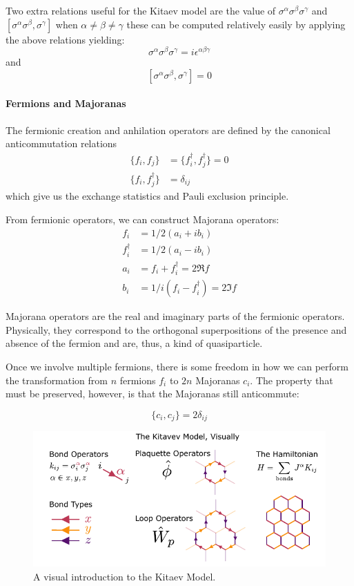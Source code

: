 Two extra relations useful for the Kitaev model are the value of \(\sigma^\alpha \sigma^\beta \sigma^\gamma\) and \([\sigma^\alpha \sigma^\beta, \sigma^\gamma]\) when \(\alpha \neq \beta \neq \gamma\) these can be computed relatively easily by applying the above relations yielding: \[\sigma^\alpha \sigma^\beta \sigma^\gamma = i \epsilon^{\alpha\beta\gamma}\] and \[[\sigma^\alpha \sigma^\beta, \sigma^\gamma] = 0\]

\hypertarget{fermions-and-majoranas}{%
\paragraph{Fermions and Majoranas}\label{fermions-and-majoranas}}

The fermionic creation and anhilation operators are defined by the canonical anticommutation relations \[\begin{aligned}
\{f_i, f_j\} &= \{f^\dagger_i, f^\dagger_j\} = 0\\
\{f_i, f^\dagger_j\} &= \delta_{ij}
\end{aligned}\] which give us the exchange statistics and Pauli exclusion principle.

From fermionic operators, we can construct Majorana operators: \[\begin{aligned}
f_i         &= 1/2 (a_i + ib_i)\\
f^\dagger_i &= 1/2(a_i - ib_i)\\
a_i         &= f_i + f^\dagger_i = 2\Re f\\
b_i         &= 1/i(f_i - f^\dagger_i) = 2\Im f 
\end{aligned}\]

Majorana operators are the real and imaginary parts of the fermionic operators. Physically, they correspond to the orthogonal superpositions of the presence and absence of the fermion and are, thus, a kind of quasiparticle.

Once we involve multiple fermions, there is some freedom in how we can perform the transformation from \(n\) fermions \(f_i\) to \(2n\) Majoranas \(c_i\). The property that must be preserved, however, is that the Majoranas still anticommute:

\[ \{c_i, c_j\} = 2\delta_{ij}\]

\hypertarget{fig:visual_kitaev_1}{%
\begin{figure}
\centering
\includegraphics[width=1\textwidth,height=\textheight]{figure_code/amk_chapter/visual_kitaev_1}
\caption[{A Visual Intro to the Kitaev Model}]{A visual introduction to the Kitaev Model.}
\label{fig:visual_kitaev_1}
\end{figure}
}


